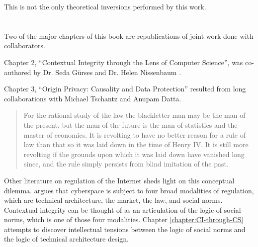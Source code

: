 \documentclass[../thesis.tex]{subfiles}
\begin{document}
 This is not the only theoretical inversions performed by this
 work.
 
 

 
 
 \section{}

 Two of the major chapters of this book are republications of joint work
 done with collaborators.

 Chapter 2, ``Contextual Integrity through the Lens of Computer Science'',
 was co-authored by Dr. Seda G{\"u}rses and Dr. Helen Nissenbaum \cite{benthall2017contextual}.

 Chapter 3, ``Origin Privacy: Causality and Data Protection'' resulted from
 long collaborations with Michael Tschantz and Anupam Datta. 



 
 \begin{quote}
 For the rational study of the law the blackletter man may be the man of the present, but the man of the future is the man of statistics and the master of economics. It is revolting to have no better reason for a rule of law than that so it was laid down in the time of Henry IV. It is still more revolting if the grounds upon which it was laid down have vanished long since, and the rule simply persists from blind imitation of the past. \cite{holmes1897path}
 \end{quote}

 
 Other literature on regulation of the Internet sheds
 light on this conceptual dilemma.
 \citet{lessig2009code} argues that
 cyberspace is subject to four broad modalities of regulation,
 which are technical architecture, the market, the law, and
 social norms.
 Contextual integrity can be thought of as an articulation
 of the logic of social norms, which is one of those four modalities.
 Chapter \ref{chapter:CI-through-CS} attempts to discover intellectual
 tensions between the logic of social norms and the logic of technical
 architecture design.


 
\end{document}
